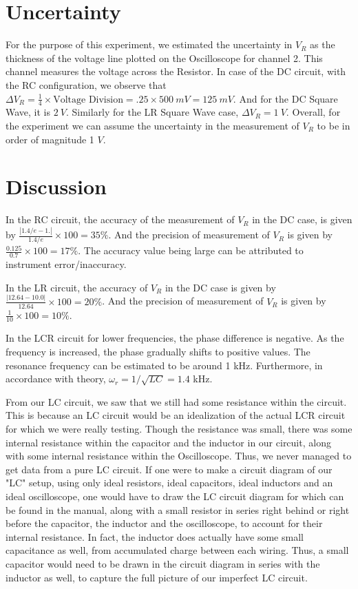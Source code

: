 \documentclass[a4paper,12pt]{article}
\begin{document}
\section{Uncertainty}

For the purpose of this experiment, we estimated the uncertainty in $V_R$
as the thickness of the voltage line plotted on the Oscilloscope for channel 2. This channel 
measures the voltage across the Resistor. In case of the DC circuit, with the RC configuration, we observe that 
$\Delta V_R = \frac{1}{4} \times \text{Voltage Division} = .25 \times 500\ mV = 125\ mV$. 
And for the DC Square Wave, it is $2\ V$. Similarly for the LR Square Wave case, $\Delta V_R = 1\ V$.
Overall, for the experiment we can assume the uncertainty in the measurement of $V_R$ to be 
in order of magnitude 1 $V$.

\section{Discussion}

In the RC circuit, the accuracy of the measurement of $V_R$ in the DC case, is given by $\frac{|1.4/e - 1.|}{1.4/e} \times 100 = 35 \%$. 
And the precision of measurement of $V_R$ is given by $\frac{0.125}{0.7} \times 100 = 17 \%$. 
The accuracy value being large can be attributed to instrument error/inaccuracy.

In the LR circuit, the accuracy of $V_R$ in the DC case is given by $\frac{|12.64 - 10.0|}{12.64} \times 100 = 20 \%$. 
And the precision of measurement of $V_R$ is given by $\frac{1}{10} \times 100 = 10 \%$. 

In the LCR circuit for lower frequencies, the phase difference is negative. As the frequency is
increased, the phase gradually shifts to positive values. The resonance frequency can be estimated to be around 1 kHz. 
Furthermore, in accordance with theory, $\omega_r = 1/\sqrt{LC} = 1.4$ kHz.

From our LC circuit, we saw that we still had some resistance within the circuit. This is because an LC circuit would 
be an idealization of the actual LCR circuit for which we were really testing. Though the resistance was small, there was
some internal resistance within the capacitor and the inductor in our circuit, along with some internal resistance within the Oscilloscope.
Thus, we never managed to get data from a pure LC circuit. If one were to make a circuit diagram of our "LC" setup, using only ideal resistors, 
ideal capacitors, ideal inductors and an ideal oscilloscope, one would have to draw the LC circuit diagram for which can be found in the manual,
along with a small resistor in series right behind or right before the capacitor, the inductor and the oscilloscope, to account for their internal resistance.
In fact, the inductor does actually have some small capacitance as well, from accumulated charge between each wiring. Thus, a small capacitor 
would need to be drawn in the circuit diagram in series with the inductor as well, to capture the full picture of our imperfect LC circuit.
\end{document}
